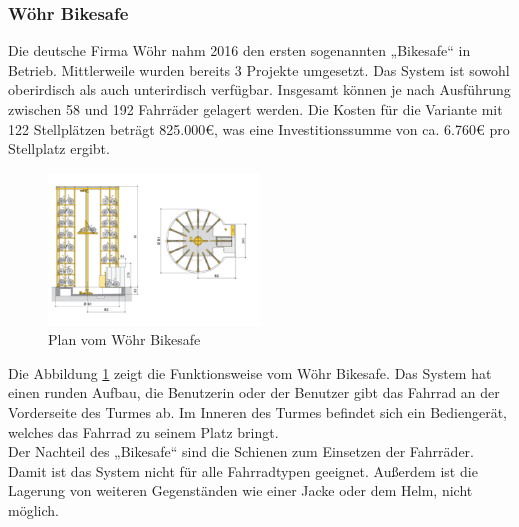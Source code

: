 \subsubsection{Wöhr Bikesafe}
Die deutsche Firma Wöhr nahm 2016 den ersten sogenannten „Bikesafe“ in Betrieb.\cite{woehrfirma} Mittlerweile wurden bereits 3 Projekte umgesetzt.\cite{woehrbikesafe} Das System ist sowohl oberirdisch als auch unterirdisch verfügbar. Insgesamt können je nach Ausführung zwischen 58 und 192 Fahrräder gelagert werden. Die Kosten für die Variante mit 122 Stellplätzen beträgt 825.000€, was eine Investitionssumme von ca. 6.760€ pro Stellplatz ergibt.\cite*{richtpreisangebot} \\

\begin{figure}[H]
    \centering
    \includegraphics[width=0.5\textwidth]{images/bikesafe.png}
    \caption{Plan vom Wöhr Bikesafe \cite{woehrbikesafebroschuere}}
    \label{fig:bikesafe}
\end{figure}

Die Abbildung \ref{fig:bikesafe} zeigt die Funktionsweise vom Wöhr Bikesafe. Das System hat einen runden Aufbau, die Benutzerin oder der Benutzer gibt das Fahrrad an der Vorderseite des Turmes ab. Im Inneren des Turmes befindet sich ein Bediengerät, welches das Fahrrad zu seinem Platz bringt.\\
Der Nachteil des „Bikesafe“ sind die Schienen zum Einsetzen der Fahrräder. Damit ist das System nicht für alle Fahrradtypen geeignet. Außerdem ist die Lagerung von weiteren Gegenständen wie einer Jacke oder dem Helm, nicht möglich.\\
